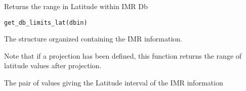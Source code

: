 %
\begin{Description}\relax
Returns the range in Latitude within IMR Db
\end{Description}
%
\begin{Usage}
\begin{verbatim}
get_db_limits_lat(dbin)
\end{verbatim}
\end{Usage}
%
\begin{Arguments}
\begin{ldescription}
\item[\code{dbin}] 
The  structure organized containing the IMR
information.

\end{ldescription}
\end{Arguments}
%
\begin{Details}\relax
Note that if a projection has been defined, this function returns the range
of latitude values after projection.
\end{Details}
%
\begin{Value}
The pair of values giving the Latitude interval of the IMR information
\end{Value}

